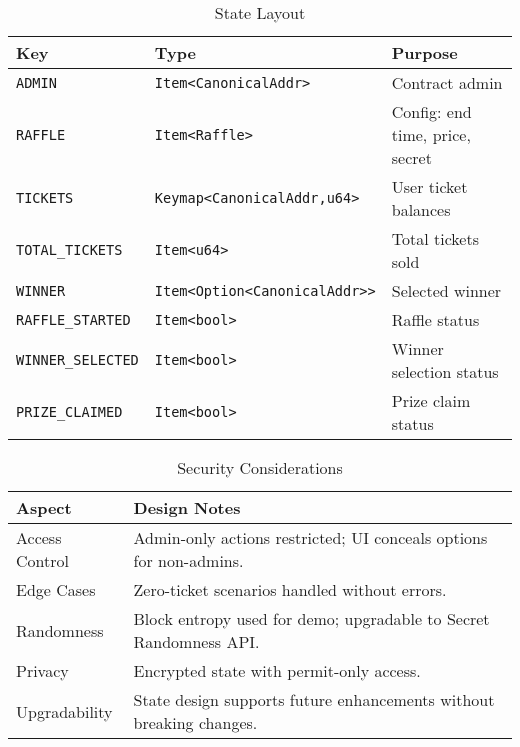 \documentclass{article}
\begin{document}
\begin{table}[h]
  \centering
  \caption{State Layout}
  \label{tab:State Layout}
  \begin{tabular}{@{}lll@{}}
    \toprule
    \textbf{Key} & \textbf{Type} & \textbf{Purpose} \\
    \midrule
    \texttt{ADMIN} & \texttt{Item<CanonicalAddr>} & Contract admin \\
    \texttt{RAFFLE} & \texttt{Item<Raffle>} & Config: end time, price, secret \\
    \texttt{TICKETS} & \texttt{Keymap<CanonicalAddr,u64>} & User ticket balances \\
    \texttt{TOTAL\_TICKETS} & \texttt{Item<u64>} & Total tickets sold \\
    \texttt{WINNER} & \texttt{Item<Option<CanonicalAddr>>} & Selected winner \\
    \texttt{RAFFLE\_STARTED} & \texttt{Item<bool>} & Raffle status \\
    \texttt{WINNER\_SELECTED} & \texttt{Item<bool>} & Winner selection status \\
    \texttt{PRIZE\_CLAIMED} & \texttt{Item<bool>} & Prize claim status \\
    \bottomrule
\end{tabular}
\end{table}

\begin{table}[h]
  \centering
  \caption{Security Considerations}
  \begin{tabular}{@{}lp{10cm}@{}}
    \toprule
    \textbf{Aspect} & \textbf{Design Notes} \\
    \midrule
    Access Control & Admin-only actions restricted; UI conceals options for non-admins. \\
    Edge Cases & Zero-ticket scenarios handled without errors. \\
    Randomness & Block entropy used for demo; upgradable to Secret Randomness API. \\
    Privacy & Encrypted state with permit-only access. \\
    Upgradability & State design supports future enhancements without breaking changes. \\
    \bottomrule
  \end{tabular}
\end{table}
\end{document}
